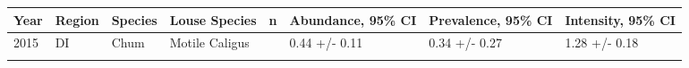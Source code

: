 \documentclass[fleqn,10pt]{wlpeerj} %
\begin{document}
\begin{longtable}[]{@{}llllrlll@{}}
\begin{minipage}[b]{0.04\columnwidth}
Year\strut
\end{minipage} & \begin{minipage}[b]{0.06\columnwidth}\raggedright
Region\strut
\end{minipage} & \begin{minipage}[b]{0.07\columnwidth}\raggedright
Species\strut
\end{minipage} & \begin{minipage}[b]{0.13\columnwidth}\raggedright
Louse Species\strut
\end{minipage} & \begin{minipage}[b]{0.03\columnwidth}\raggedleft
n\strut
\end{minipage} & \begin{minipage}[b]{0.15\columnwidth}\raggedright
Abundance, 95\% CI\strut
\end{minipage} & \begin{minipage}[b]{0.16\columnwidth}\raggedright
Prevalence, 95\% CI\strut
\end{minipage} & \begin{minipage}[b]{0.15\columnwidth}\raggedright
Intensity, 95\% CI\strut
\end{minipage}\tabularnewline
\midrule
\endhead
\begin{minipage}[t]{0.04\columnwidth}\raggedright
2015\strut
\end{minipage} & \begin{minipage}[t]{0.06\columnwidth}\raggedright
DI\strut
\end{minipage} & \begin{minipage}[t]{0.07\columnwidth}\raggedright
Chum\strut
\end{minipage} & \begin{minipage}[t]{0.13\columnwidth}\raggedright
Motile Caligus\strut
\end{minipage} & \begin{minipage}[t]{0.03\columnwidth}\raggedleft
179\strut
\end{minipage} & \begin{minipage}[t]{0.15\columnwidth}\raggedright
0.44 +/- 0.11\strut
\end{minipage} & \begin{minipage}[t]{0.16\columnwidth}\raggedright
0.34 +/- 0.27\strut
\end{minipage} & \begin{minipage}[t]{0.15\columnwidth}\raggedright
1.28 +/- 0.18\strut
\end{minipage}\tabularnewline
\begin{minipage}[t]{0.04\columnwidth}\raggedright

\end{minipage}
\end{longtable}
\end{document}
